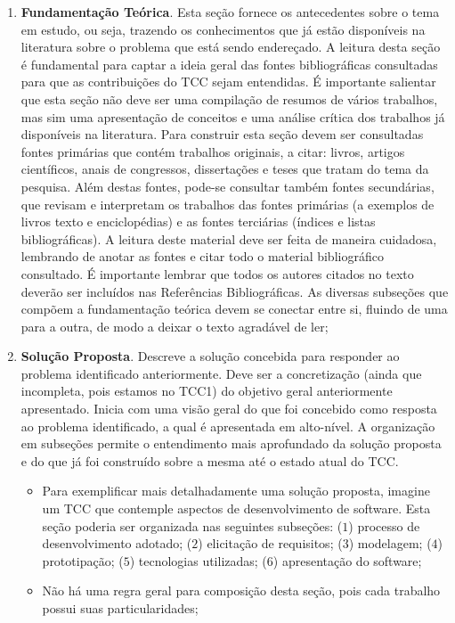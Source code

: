 \begin{enumerate}[resume]
  \item \textbf{Fundamentação Teórica}. Esta seção fornece os antecedentes sobre o tema em estudo, ou seja, trazendo os conhecimentos que já estão disponíveis na literatura sobre o problema que está sendo endereçado. A leitura desta seção é fundamental para captar a ideia geral das fontes bibliográficas consultadas para que as contribuições do TCC sejam entendidas. É importante salientar que esta seção não deve ser uma compilação de resumos de vários trabalhos, mas sim uma apresentação de conceitos e uma análise crítica dos trabalhos já disponíveis na literatura. Para construir esta seção devem ser consultadas fontes primárias que contém trabalhos originais, a citar: livros, artigos científicos, anais de congressos, dissertações e teses que tratam do tema da pesquisa.  Além destas fontes, pode-se consultar também fontes secundárias, que revisam e interpretam os trabalhos das fontes primárias (a exemplos de livros texto e enciclopédias) e as fontes terciárias (índices e listas bibliográficas).  A leitura deste material deve ser feita de maneira cuidadosa, lembrando de anotar as fontes e citar todo o material bibliográfico consultado. É importante lembrar que todos os autores citados no texto deverão ser incluídos nas Referências Bibliográficas. As diversas subseções que compõem a fundamentação teórica devem se conectar entre si, fluindo de uma para a outra, de modo a deixar o texto agradável de ler;
  \item \textbf{Solução Proposta}. Descreve a solução concebida para responder ao problema identificado anteriormente. Deve ser a concretização (ainda que incompleta, pois estamos no TCC1) do objetivo geral anteriormente apresentado. Inicia com uma visão geral do que foi concebido como resposta ao problema identificado, a qual é apresentada em alto-nível. A organização em subseções permite o entendimento mais aprofundado da solução proposta e do que já foi construído sobre a mesma até o estado atual do TCC.
  \begin{itemize}
    \item Para exemplificar mais detalhadamente uma solução proposta, imagine um TCC que contemple aspectos de desenvolvimento de software. Esta seção poderia ser organizada nas seguintes subseções: ($1$) processo de desenvolvimento adotado; ($2$) elicitação de requisitos; ($3$) modelagem; ($4$) prototipação; ($5$) tecnologias utilizadas; ($6$) apresentação do software;
    \item Não há uma regra geral para composição desta seção, pois cada trabalho possui suas particularidades;

\end{itemize}
\end{enumerate}

